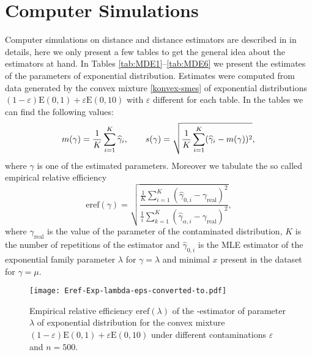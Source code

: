 \section{Computer Simulations}
Computer simulations on \ren distance and \ren distance estimators are described in \cite{Kucera2012} in details, here we only present a few tables to get the general idea about the estimators at hand. In Tables \ref{tab:MDE1}--\ref{tab:MDE6} we present the estimates of the parameters of  exponential distribution. Estimates were computed from data generated by the  convex mixture \eqref{konvex-smes} of exponential distributions $(1-\varepsilon)\mathrm{E}(0,1) + \varepsilon\mathrm{E}(0,10)$  with $\varepsilon$ different for each table. In the tables we can find the following values:
\begin{equation}
	m(\gamma) = \frac{1}{K}\sum_{i=1}^K \widehat{\gamma}_{i}, \qquad s(\gamma) = \sqrt{\frac{1}{K}\sum_{i=1}^K (\widehat{\gamma}_{i}-{m(\gamma)})^2},\\
	\label{stat1}
\end{equation}
where $\gamma $ is one of the estimated parameters. Moreover we tabulate the so called empirical relative efficiency 
\begin{equation}
	\mathrm{eref}(\gamma) = \sqrt{\dfrac{\frac{1}{K}\sum_{i=1}^K (\widehat{\gamma}_{\mathrm{0} ,i} - \gamma_{\mathrm{real}})^2}{\frac{1}{i}\sum_{k=1}^K (\widehat{\gamma}_{\alpha,i} - \gamma_{\mathrm{real}})^2}},
	\label{stat2}
\end{equation}
where $\gamma_\mathrm{real}$ is the value of the parameter of the contaminated distribution,  $K$ is the number of repetitions of the estimator and $\widehat{\gamma}_{0,i}$ is the MLE estimator of the exponential family parameter $\lambda$ for $\gamma = \lambda$ and minimal $x$ present in the dataset for $\gamma = \mu$.
\begin{figure}[htb]
\centering
\texttt{[image: Eref-Exp-lambda-eps-converted-to.pdf]}
\caption{Empirical relative efficiency $\mathrm{eref}(\lambda)$ of the \mRa-estimator of parameter $\lambda$ of exponential distribution for the convex mixture $(1-\varepsilon)\mathrm{E}(0,1) + \varepsilon\mathrm{E}(0,10)$ under different contaminations $\varepsilon$ and $n=500.$}
\label{fig:eref}
\end{figure}

